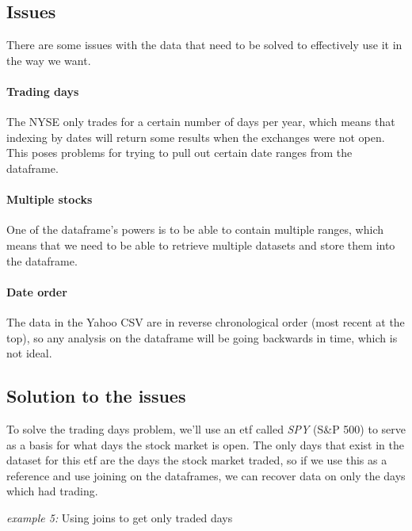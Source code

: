 \subsection{Issues}
\noindent There are some issues with the data that need to be solved
to effectively use it in the way we want.

\paragraph{Trading days} The NYSE only trades for a certain number of
days per year, which means that indexing by dates will return some
results when the exchanges were not open. This poses problems for
trying to pull out certain date ranges from the dataframe.

\paragraph{Multiple stocks} One of the dataframe's powers is to be
able to contain multiple ranges, which means that we need to be able
to retrieve multiple datasets and store them into the dataframe.

\paragraph{Date order} The data in the Yahoo CSV are in reverse
chronological order (most recent at the top), so any analysis on the
dataframe will be going backwards in time, which is not ideal.

\subsection{Solution to the issues}
\noindent To solve the trading days problem, we'll use an \ac{etf}
called \textit{SPY} (S\&P 500) to serve as a basis for what days the
stock market is open. The only days that exist in the dataset for
this \ac{etf} are the days the stock market traded, so if we use this
as a reference and use joining on the dataframes, we can recover data
on only the days which had trading.\\

\noindent
\begin{minipage}{\linewidth}
  \noindent\textit{example 5:} Using joins to get only traded days

  
\end{minipage}

